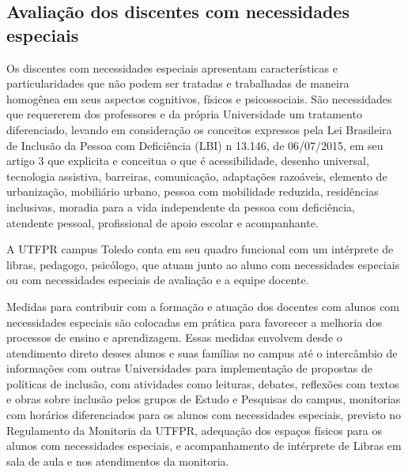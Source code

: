 \subsection{Avaliação dos discentes com necessidades especiais}

Os discentes com necessidades especiais apresentam características e particularidades que não podem ser tratadas e trabalhadas de maneira homogênea em seus aspectos cognitivos, físicos e psicossociais. São necessidades que requererem dos professores e da própria Universidade um tratamento diferenciado, levando em consideração os conceitos expressos pela Lei Brasileira de Inclusão da Pessoa com Deficiência (LBI) n\textordmasculine{} 13.146, de 06/07/2015, em seu artigo 3\textordmasculine{} que explicita e conceitua o que é acessibilidade, desenho universal, tecnologia assistiva, barreiras, comunicação, adaptações razoáveis, elemento de urbanização, mobiliário urbano, pessoa com mobilidade reduzida, residências inclusivas, moradia para a vida independente da pessoa com deficiência, atendente pessoal, profissional de apoio escolar e acompanhante.

A UTFPR campus Toledo conta em seu quadro funcional com um intérprete de libras, pedagogo, psicólogo, que atuam junto ao aluno com necessidades especiais ou com necessidades especiais de avaliação e a equipe docente.

Medidas para contribuir com a formação e atuação dos docentes com alunos com necessidades especiais são colocadas em prática para favorecer a melhoria dos processos de ensino e aprendizagem. Essas medidas envolvem desde o atendimento direto desses alunos e suas famílias no campus até o intercâmbio de informações com outras Universidades para implementação de propostas de políticas de inclusão, com atividades como leituras, debates, reflexões com textos e obras sobre inclusão pelos grupos de Estudo e Pesquisas do campus, monitorias com horários diferenciados para os alunos com necessidades especiais, previsto no Regulamento da Monitoria da UTFPR, adequação dos espaços físicos para os alunos com necessidades especiais, e acompanhamento de intérprete de Libras em sala de aula e nos atendimentos da monitoria.

  